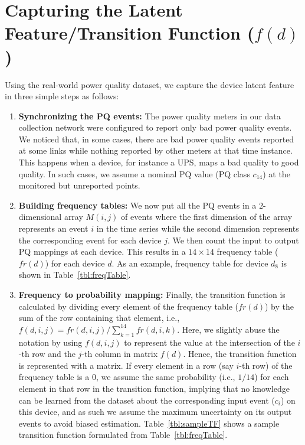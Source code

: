 \section{Capturing the Latent Feature/Transition Function ($f(d)$)}
Using the real-world power quality dataset, we capture the device latent feature in three simple steps as follows:

\begin{enumerate} \setlength{\itemsep}{5pt}
\item \textbf{Synchronizing the PQ events:} The power quality meters in our data collection network were configured to report only bad power quality events. We noticed that, in some cases, there are bad power quality events reported at some links while nothing reported by other meters at that time instance. This happens when a device, for instance a UPS, maps a bad quality to good quality. In such cases, we assume a nominal PQ value (PQ class $c_{14}$) at the monitored but unreported points.

\item \textbf{Building frequency tables:} We now put all the PQ events in a $2$-dimensional array $M(i, j)$ of events where the first dimension of the array represents an event $i$ in the time series while the second dimension represents the corresponding event for each device $j$. We then count the input to output PQ mappings at each device. This results in a $14 \times 14$ frequency table ($fr(d)$) for each device $d$. As an example, frequency table for device $d_8$ is shown in Table~\ref{tbl:freqTable}.

\item  \textbf{Frequency to probability mapping:} Finally, the transition function is calculated by dividing every element of the frequency table ($fr(d)$) by the sum of the row containing that element, i.e., $f(d, i, j) = fr(d, i, j) / \sum_{k=1}^{14} fr(d, i, k)$. Here, we slightly abuse the notation by using $f(d, i, j)$ to represent the value at the intersection of the $i$-th row and the $j$-th column in matrix $f(d)$. Hence, the transition function is represented with a matrix. If every element in a row (say $i$-th row) of the frequency table is a $0$, we assume the same probability (i.e., $1/14$) for each element in that row in the transition function, implying that no knowledge can be learned from the dataset about the corresponding input event ($c_i$) on this device, and as such we assume the maximum uncertainty on its output events to avoid biased estimation. Table~\ref{tbl:sampleTF} shows a sample transition function formulated from Table~\ref{tbl:freqTable}.
\end{enumerate}

